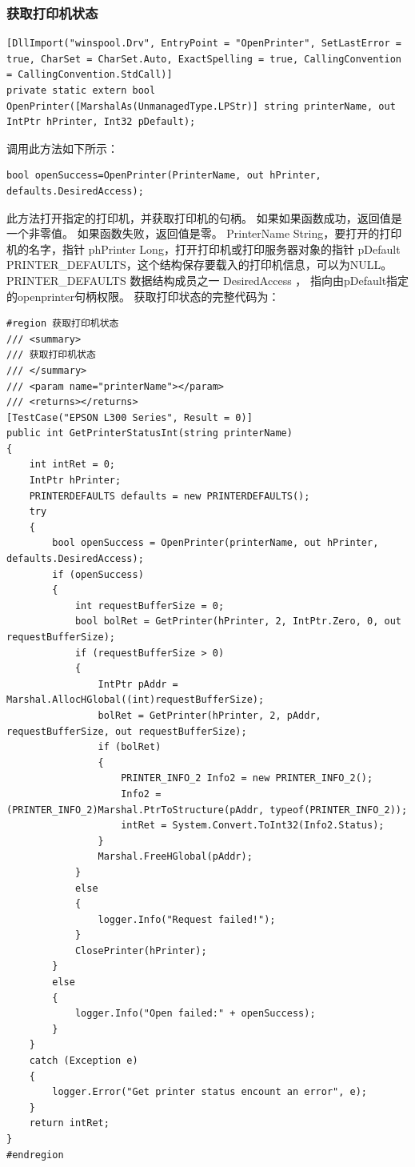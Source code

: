 \documentclass{book}
\begin{document}
\subsubsection{获取打印机状态}

\begin{lstlisting}
[DllImport("winspool.Drv", EntryPoint = "OpenPrinter", SetLastError = true, CharSet = CharSet.Auto, ExactSpelling = true, CallingConvention = CallingConvention.StdCall)]
private static extern bool OpenPrinter([MarshalAs(UnmanagedType.LPStr)] string printerName, out IntPtr hPrinter, Int32 pDefault);
\end{lstlisting}

调用此方法如下所示：

\begin{lstlisting}
bool openSuccess=OpenPrinter(PrinterName, out hPrinter, defaults.DesiredAccess);
\end{lstlisting}

此方法打开指定的打印机，并获取打印机的句柄。
如果如果函数成功，返回值是一个非零值。
如果函数失败，返回值是零。
PrinterName String，要打开的打印机的名字，指针
phPrinter Long，打开打印机或打印服务器对象的指针
pDefault PRINTER\_DEFAULTS，这个结构保存要载入的打印机信息，可以为NULL。
PRINTER\_DEFAULTS 数据结构成员之一 DesiredAccess ， 
指向由pDefault指定的openprinter句柄权限。
获取打印状态的完整代码为：

\begin{lstlisting}
#region 获取打印机状态
/// <summary>
/// 获取打印机状态
/// </summary>
/// <param name="printerName"></param>
/// <returns></returns>
[TestCase("EPSON L300 Series", Result = 0)]
public int GetPrinterStatusInt(string printerName)
{
    int intRet = 0;
    IntPtr hPrinter;
    PRINTERDEFAULTS defaults = new PRINTERDEFAULTS();
    try
    {
        bool openSuccess = OpenPrinter(printerName, out hPrinter, defaults.DesiredAccess);
        if (openSuccess)
        {
            int requestBufferSize = 0;
            bool bolRet = GetPrinter(hPrinter, 2, IntPtr.Zero, 0, out requestBufferSize);
            if (requestBufferSize > 0)
            {
                IntPtr pAddr = Marshal.AllocHGlobal((int)requestBufferSize);
                bolRet = GetPrinter(hPrinter, 2, pAddr, requestBufferSize, out requestBufferSize);
                if (bolRet)
                {
                    PRINTER_INFO_2 Info2 = new PRINTER_INFO_2();
                    Info2 = (PRINTER_INFO_2)Marshal.PtrToStructure(pAddr, typeof(PRINTER_INFO_2));
                    intRet = System.Convert.ToInt32(Info2.Status);
                }
                Marshal.FreeHGlobal(pAddr);
            }
            else
            {
                logger.Info("Request failed!");
            }
            ClosePrinter(hPrinter);
        }
        else
        {
            logger.Info("Open failed:" + openSuccess);
        }
    }
    catch (Exception e)
    {
        logger.Error("Get printer status encount an error", e);
    }
    return intRet;
}
#endregion
\end{lstlisting}
\end{document}

